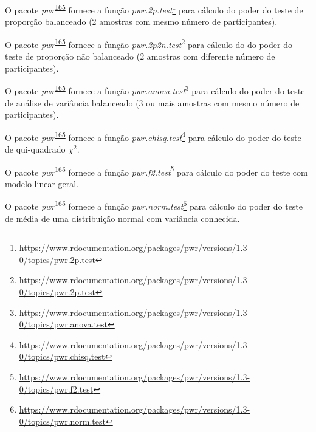\documentclass[
  a4paper,
]{book}
\renewcommand{\href}[2]{#2\footnote{\url{#1}}}
\newenvironment{infobox}[1]
  {
  \begin{itemize}
  \renewcommand{\labelitemi}{
    \raisebox{-.7\height}[0pt][0pt]{
      {\setkeys{Gin}{width=3em,keepaspectratio}
        \texttt{[image: \#1]}}
    }
  }
  \setlength{\fboxsep}{1em}
  \begin{blackbox}
  \item
  }
  {
  \end{blackbox}
  \end{itemize}
  }
\begin{document}
\begin{infobox}{images/Rlogo}
O pacote \emph{pwr}\textsuperscript{\protect\hyperlink{ref-pwr}{165}} fornece a função \href{https://www.rdocumentation.org/packages/pwr/versions/1.3-0/topics/pwr.2p.test}{\emph{pwr.2p.test}} para cálculo do poder do teste de proporção balanceado (2 amostras com mesmo número de participantes).

\end{infobox}

\begin{infobox}{images/Rlogo}
O pacote \emph{pwr}\textsuperscript{\protect\hyperlink{ref-pwr}{165}} fornece a função \href{https://www.rdocumentation.org/packages/pwr/versions/1.3-0/topics/pwr.2p.test}{\emph{pwr.2p2n.test}} para cálculo do do poder do teste de proporção não balanceado (2 amostras com diferente número de participantes).

\end{infobox}

\begin{infobox}{images/Rlogo}
O pacote \emph{pwr}\textsuperscript{\protect\hyperlink{ref-pwr}{165}} fornece a função \href{https://www.rdocumentation.org/packages/pwr/versions/1.3-0/topics/pwr.anova.test}{\emph{pwr.anova.test}} para cálculo do poder do teste de análise de variância balanceado (3 ou mais amostras com mesmo número de participantes).

\end{infobox}

\begin{infobox}{images/Rlogo}
O pacote \emph{pwr}\textsuperscript{\protect\hyperlink{ref-pwr}{165}} fornece a função \href{https://www.rdocumentation.org/packages/pwr/versions/1.3-0/topics/pwr.chisq.test}{\emph{pwr.chisq.test}} para cálculo do poder do teste de qui-quadrado \(\chi^2\).

\end{infobox}

\begin{infobox}{images/Rlogo}
O pacote \emph{pwr}\textsuperscript{\protect\hyperlink{ref-pwr}{165}} fornece a função \href{https://www.rdocumentation.org/packages/pwr/versions/1.3-0/topics/pwr.f2.test}{\emph{pwr.f2.test}} para cálculo do poder do teste com modelo linear geral.

\end{infobox}

\begin{infobox}{images/Rlogo}
O pacote \emph{pwr}\textsuperscript{\protect\hyperlink{ref-pwr}{165}} fornece a função \href{https://www.rdocumentation.org/packages/pwr/versions/1.3-0/topics/pwr.norm.test}{\emph{pwr.norm.test}} para cálculo do poder do teste de média de uma distribuição normal com variância conhecida.

\end{infobox}
\end{document}
